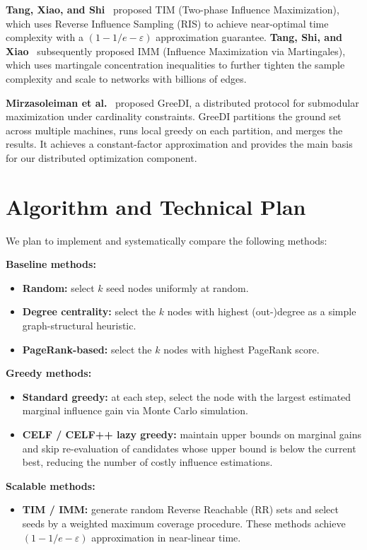 \documentclass[10pt]{article}
\begin{document}
\textbf{Tang, Xiao, and Shi}~\cite{tang2014} proposed TIM (Two-phase
Influence Maximization), which uses Reverse Influence Sampling (RIS) to
achieve near-optimal time complexity with a $(1-1/e-\varepsilon)$
approximation guarantee. \textbf{Tang, Shi, and Xiao}~\cite{tang2015}
subsequently proposed IMM (Influence Maximization via Martingales), which uses
martingale concentration inequalities to further tighten the sample complexity
and scale to networks with billions of edges.

\textbf{Mirzasoleiman et al.}~\cite{mirzasoleiman2013} proposed GreeDI, a
distributed protocol for submodular maximization under cardinality constraints.
GreeDI partitions the ground set across multiple machines, runs local greedy
on each partition, and merges the results. It achieves a constant-factor
approximation and provides the main basis for our distributed optimization
component.

\section{Algorithm and Technical Plan}

We plan to implement and systematically compare the following methods:

\textbf{Baseline methods:}
\begin{itemize}
    \item \textbf{Random:} select $k$ seed nodes uniformly at random.
    \item \textbf{Degree centrality:} select the $k$ nodes with highest
    (out-)degree as a simple graph-structural heuristic.
    \item \textbf{PageRank-based:} select the $k$ nodes with highest PageRank
    score.
\end{itemize}

\textbf{Greedy methods:}
\begin{itemize}
    \item \textbf{Standard greedy:} at each step, select the node with the
    largest estimated marginal influence gain via Monte Carlo simulation.
    \item \textbf{CELF / CELF++ lazy greedy:} maintain upper bounds on marginal
    gains and skip re-evaluation of candidates whose upper bound is below the
    current best, reducing the number of costly influence estimations.
\end{itemize}

\textbf{Scalable methods:}
\begin{itemize}
    \item \textbf{TIM / IMM:} generate random Reverse Reachable (RR) sets and
    select seeds by a weighted maximum coverage procedure. These methods
    achieve $(1-1/e-\varepsilon)$ approximation in near-linear time.
\end{itemize}
\end{document}
